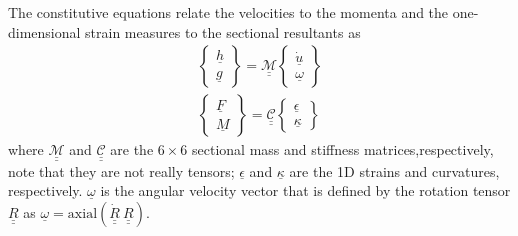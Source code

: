 \documentclass{aiaa-tc}
\begin{document}
The constitutive equations relate the velocities to the momenta and the one-dimensional strain measures to the sectional resultants as
\begin{align}
	\label{ConstitutiveMass}
	\begin{Bmatrix}
	\underline{h} \\
	\underline{g}
	\end{Bmatrix}
	= \underline{\underline{\mathcal{M}}} \begin{Bmatrix}
	\dot{\underline{u}} \\
	\underline{\omega}
	\end{Bmatrix} \\
	\label{ConstitutiveStiff}
	\begin{Bmatrix}
	\underline{F} \\
	\underline{M}
	\end{Bmatrix}
	= \underline{\underline{\mathcal{C}}} \begin{Bmatrix}
	\underline{\epsilon} \\
	\underline{\kappa}
	\end{Bmatrix}
\end{align}
where $\underline{\underline{\mathcal{M}}}$ and
$\underline{\underline{\mathcal{C}}}$ are the $6 \times 6$ sectional mass
and stiffness matrices,respectively, note that they are not really tensors;
$\underline{\epsilon}$ and $\underline{\kappa}$ are the 1D strains and
curvatures, respectively. $\underline{\omega}$ is the angular velocity
vector that is defined by the rotation tensor $\underline{\underline{R}}$ as
$\underline{\omega} = \mathrm{axial}(\dot{\underline{\underline{R}}}~\underline{\underline{R}})$.
\end{document}
